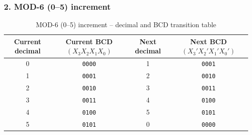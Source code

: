 \documentclass[12pt,letterpaper]{article}
\begin{document}
\subsubsection{2. MOD-6 (0--5) increment}
\begin{table}[H]\centering
\caption{MOD-6 (0--5) increment -- decimal and BCD transition table}
\label{tab:kmap-mod6-inc-trans}
\scriptsize
\begin{tabular}{c c c c}\toprule
Current decimal & Current BCD $(X_3X_2X_1X_0)$ & Next decimal & Next BCD $(X_3'X_2'X_1'X_0')$ \\
\midrule
0 & \texttt{0000} & 1 & \texttt{0001} \\
1 & \texttt{0001} & 2 & \texttt{0010} \\
2 & \texttt{0010} & 3 & \texttt{0011} \\
3 & \texttt{0011} & 4 & \texttt{0100} \\
4 & \texttt{0100} & 5 & \texttt{0101} \\
5 & \texttt{0101} & 0 & \texttt{0000} \\
\bottomrule
\end{tabular}
\end{table}
\end{document}
